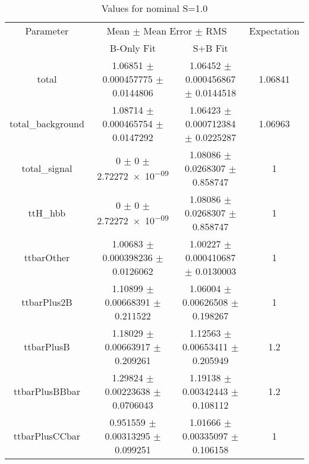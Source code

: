 \begin{table}
\centering
\caption{Values for nominal S=1.0}
\begin{tabular}{cccc}
\toprule
Parameter & \multicolumn{2}{c}{Mean $\pm$ Mean Error $\pm$ RMS} & Expectation\\
 & B-Only Fit & S+B Fit & \\
\midrule
total & \num{1.06851} $\pm$ \num{0.000457775} $\pm$ \num{0.0144806} & \num{1.06452} $\pm$ \num{0.000456867} $\pm$ \num{0.0144518} & \num{1.06841}\\
total\_background & \num{1.08714} $\pm$ \num{0.000465754} $\pm$ \num{0.0147292} & \num{1.06423} $\pm$ \num{0.000712384} $\pm$ \num{0.0225287} & \num{1.06963}\\
total\_signal & \num{0} $\pm$ \num{0} $\pm$ \num{2.72272e-09} & \num{1.08086} $\pm$ \num{0.0268307} $\pm$ \num{0.858747} & \num{1}\\
ttH\_hbb & \num{0} $\pm$ \num{0} $\pm$ \num{2.72272e-09} & \num{1.08086} $\pm$ \num{0.0268307} $\pm$ \num{0.858747} & \num{1}\\
ttbarOther & \num{1.00683} $\pm$ \num{0.000398236} $\pm$ \num{0.0126062} & \num{1.00227} $\pm$ \num{0.000410687} $\pm$ \num{0.0130003} & \num{1}\\
ttbarPlus2B & \num{1.10899} $\pm$ \num{0.00668391} $\pm$ \num{0.211522} & \num{1.06004} $\pm$ \num{0.00626508} $\pm$ \num{0.198267} & \num{1}\\
ttbarPlusB & \num{1.18029} $\pm$ \num{0.00663917} $\pm$ \num{0.209261} & \num{1.12563} $\pm$ \num{0.00653411} $\pm$ \num{0.205949} & \num{1.2}\\
ttbarPlusBBbar & \num{1.29824} $\pm$ \num{0.00223638} $\pm$ \num{0.0706043} & \num{1.19138} $\pm$ \num{0.00342443} $\pm$ \num{0.108112} & \num{1.2}\\
ttbarPlusCCbar & \num{0.951559} $\pm$ \num{0.00313295} $\pm$ \num{0.099251} & \num{1.01666} $\pm$ \num{0.00335097} $\pm$ \num{0.106158} & \num{1}\\
\bottomrule
\end{tabular}
\end{table}